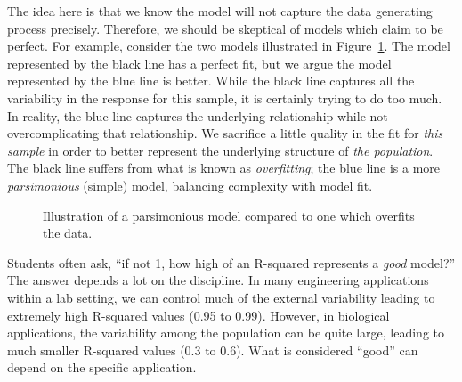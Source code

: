 \documentclass[
  letterpaper,
  DIV=11,
  numbers=noendperiod]{scrreprt}
\theoremstyle{plain}
\theoremstyle{definition}
\theoremstyle{definition}
\theoremstyle{remark}
\begin{document}
The idea here is that we know the model will not capture the data
generating process precisely. Therefore, we should be skeptical of
models which claim to be perfect. For example, consider the two models
illustrated in Figure~\ref{fig-regquality-overfit}. The model
represented by the black line has a perfect fit, but we argue the model
represented by the blue line is better. While the black line captures
all the variability in the response for this sample, it is certainly
trying to do too much. In reality, the blue line captures the underlying
relationship while not overcomplicating that relationship. We sacrifice
a little quality in the fit for \emph{this sample} in order to better
represent the underlying structure of \emph{the population}. The black
line suffers from what is known as \emph{overfitting}; the blue line is
a more \emph{parsimonious} (simple) model, balancing complexity with
model fit.

\begin{figure}


\caption{\label{fig-regquality-overfit}Illustration of a parsimonious
model compared to one which overfits the data.}

\end{figure}%

Students often ask, ``if not 1, how high of an R-squared represents a
\emph{good} model?'' The answer depends a lot on the discipline. In many
engineering applications within a lab setting, we can control much of
the external variability leading to extremely high R-squared values
(0.95 to 0.99). However, in biological applications, the variability
among the population can be quite large, leading to much smaller
R-squared values (0.3 to 0.6). What is considered ``good'' can depend on
the specific application.
\end{document}

